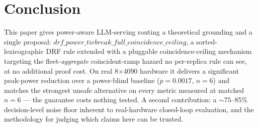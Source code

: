 \documentclass[sigconf,review,anonymous]{acmart}
\begin{document}
\vspace{-8pt}
\section{Conclusion}

This paper gives power-aware LLM-serving routing a theoretical grounding and a single
proposal: $\mathit{drf\_power\_tiebreak\_full\_coincidence\_ceiling}$, a sorted-lexicographic
DRF rule extended with a pluggable coincidence-ceiling mechanism targeting the
fleet-\emph{aggregate} coincident-ramp hazard no per-replica rule can see, at no additional
proof cost. On real 8$\times$4090 hardware it delivers a significant peak-power reduction over
a power-blind baseline ($p{=}0.0017$, $n{=}6$) and matches the strongest unsafe alternative on
every metric measured at matched $n{=}6$ --- the guarantee costs nothing tested. A second
contribution: a ${\sim}75$--85\% decision-level noise floor inherent to real-hardware
closed-loop evaluation, and the methodology for judging which claims here can be trusted.



\end{document}
